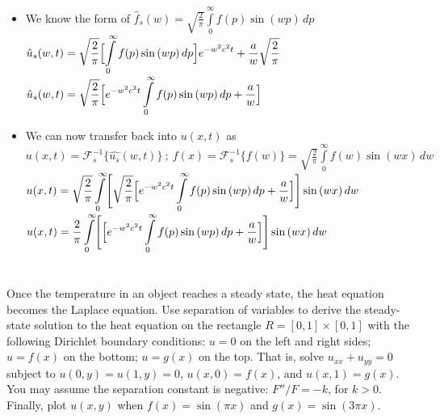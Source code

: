 \documentclass[10pt]{article}
\begin{document}
\begin{itemize}
\newpage

    \item We know the form of $ \displaystyle \hat{f}_{s}(w) = \sqrt{\frac{2}{\pi}} \int \limits_{0}^{\infty} f(p)\sin{(wp)} \, dp $ \\
    \subitem $ \displaystyle \hat{u}_{s}(w,t) = \sqrt{\frac{2}{\pi}} \Bigl[ \int \limits_{0}^{\infty} f(p)\sin{(wp)} \, dp \Bigr]e^{-w^2c^2t} + \frac{a}{w}\sqrt{\frac{2}{\pi}} $ \\
    \subitem $ \displaystyle \hat{u}_{s}(w,t) = \sqrt{\frac{2}{\pi}} \Bigl[ e^{-w^2c^2t} \int \limits_{0}^{\infty} f(p)\sin{(wp)} \, dp + \frac{a}{w} \Bigr] $ \\
    \item We can now transfer back into $ \displaystyle u(x,t) $ as $ \displaystyle u(x,t) = \mathcal{F}_{s}^{-1}\{ \hat{u_{s}}(w,t) \} \ ; \ f(x) = \mathcal{F}_{s}^{-1}\{f(w)\} = \sqrt{\frac{2}{\pi}} \int \limits_{0}^{\infty} f(w)\sin{(wx)} \, dw $ \\
    \subitem $ \displaystyle u(x,t) = \sqrt{\frac{2}{\pi}} \int \limits_{0}^{\infty} \Biggl[ \sqrt{\frac{2}{\pi}} \Bigl[ e^{-w^2c^2t} \int \limits_{0}^{\infty} f(p)\sin{(wp)} \, dp + \frac{a}{w} \Bigr] \Biggr]\sin{(wx)} \, dw $ \\
    \subitem $ \displaystyle u(x,t) = \frac{2}{\pi} \int \limits_{0}^{\infty} \Biggl[ \Bigl[ e^{-w^2c^2t} \int \limits_{0}^{\infty} f(p)\sin{(wp)} \, dp + \frac{a}{w} \Bigr] \Biggr]\sin{(wx)} \, dw $ \\
\end{itemize}

\newpage


\section{\underline{}}
\label{sec: Problem 4}

\noindent
Once the temperature in an object reaches a steady state,
the heat equation becomes the Laplace equation.
Use separation of variables to derive the steady-state solution to the heat equation on the rectangle
$ R = [0,1] \times [0,1] $ with the following Dirichlet boundary conditions:
$ u = 0 $ on the left and right sides;
$ u = f(x) $ on the bottom;
$ u = g(x) $ on the top.
That is, solve $ u_{xx} + u_{yy} = 0 $ subject to
$ u(0,y) = u(1,y) = 0 $, $ u(x,0) = f(x) $, and $ u(x,1) = g(x) $.
You may assume the separation constant is negative: $ F'' / F = -k $, for $ k > 0 $.
Finally, plot $ u(x,y) $ when $ f(x) = \sin{(\pi x)} $ and $ g(x) = \sin{(3\pi x)} $. \\
\vspace{2.5mm}
\end{document}
